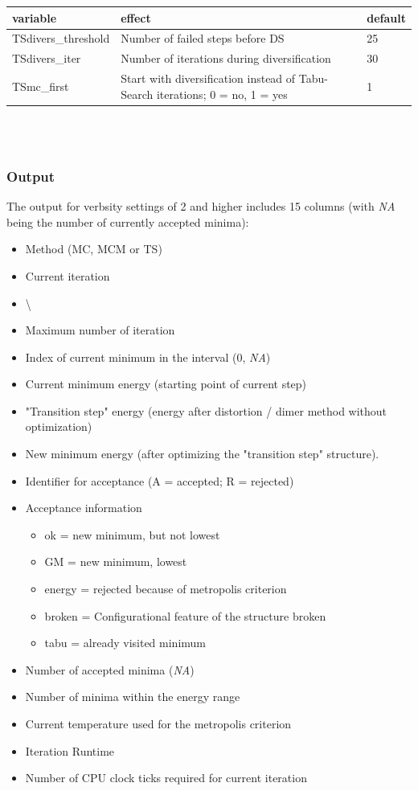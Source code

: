 \documentclass[10pt,a4paper]{article} %
\newif\ifdevmode %
\begin{document}
	\begin{tabularx}{\textwidth}{l|X|X}
		variable & effect & default \\
		\hline
		TSdivers\_threshold & Number of failed steps before \acl{DS} & 25 \\
		TSdivers\_iter & Number of iterations during diversification & 30 \\
		TSmc\_first & Start with diversification instead of Tabu-Search iterations; 0 = no, 1 = yes & 1 \\
	\end{tabularx}
	\\~\\
	\subsubsection{Output}
	The output for verbsity settings of 2 and higher includes 15 columns (with \textit{NA} being the number of currently accepted minima):\\
	\begin{itemize}
		\item Method (\ac{MC}, \ac{MCM} or \ac{TS})
		\item Current iteration
		\item \textbackslash \ifdevmode \colorbox{red}{I guess that means blank line, does it?} \fi
		\item Maximum number of iteration
		\item Index of current minimum in the interval (0, \textit{NA})
		\item Current minimum energy (starting point of current step)
		\item "Transition step" energy (energy after distortion / dimer method without optimization)
		\item New minimum energy (after optimizing the "transition step" structure).
		\item Identifier for acceptance (A = accepted; R = rejected)
		\item Acceptance information
		\begin{itemize}
			\item ok = new minimum, but not lowest
			\item GM = new minimum, lowest
			\item energy = rejected because of metropolis criterion
			\item broken = Configurational feature of the structure broken
			\item tabu = already visited minimum
		\end{itemize}
		\item Number of accepted minima (\textit{NA})
		\item Number of minima within the energy range
		\item Current temperature used for the metropolis criterion
		\item Iteration Runtime
		\item Number of CPU clock ticks required for current iteration
	\end{itemize}
	
\end{document}
